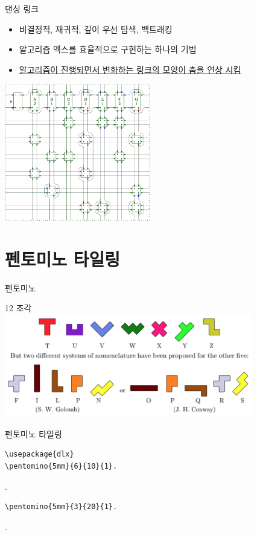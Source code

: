 \documentclass[xcolor=svgnames]{beamer}
\begin{document}
%
\begin{frame}{댄싱 링크}
  \begin{itemize}
  \item 비결정적, 재귀적, 깊이 우선 탐색, 백트래킹
  \item 알고리즘 엑스를 효율적으로 구현하는 하나의 기법
  \item \href{https://www.youtube.com/watch?v=pN76VICZiKU&start=100}
    {알고리즘이 진행되면서 변화하는 링크의 모양이 춤을 연상 시킴}
  \end{itemize}
  \vspace{-3mm}
  \begin{center}
    \includegraphics[height=60mm]{imgs/cdance-4.png}
  \end{center}
\end{frame}


\section{펜토미노 타일링}

%
\begin{frame}{펜토미노}
  \begin{center}
  {\Large 12 조각} \\
  \includegraphics[height=4.5cm]{imgs/pentominoes.png}
  \end{center}
\end{frame}

%
\begin{frame}[fragile]{펜토미노 타일링}
\begin{verbatim}
\usepackage{dlx}
\pentomino{5mm}{6}{10}{1}.
\end{verbatim}
\vspace{-5mm}
.
\vspace{-5mm}
\begin{verbatim}
\pentomino{5mm}{3}{20}{1}.
\end{verbatim}
\vspace{-5mm}
.
\end{frame}
\end{document}

